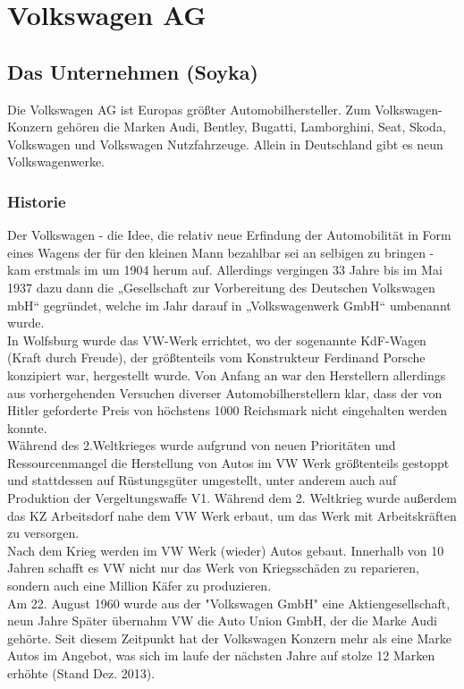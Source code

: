 \documentclass[12pt]{article}
\begin{document}
\section{Volkswagen AG}
\subsection{Das Unternehmen (Soyka) }
Die Volkswagen AG ist Europas größter Automobilhersteller. Zum Volkswagen-Konzern gehören die Marken Audi, Bentley, Bugatti, Lamborghini, Seat, Skoda, Volkswagen und Volkswagen Nutzfahrzeuge. Allein in Deutschland gibt es neun Volkswagenwerke.
\subsubsection{Historie}
Der Volkswagen - die Idee, die relativ neue Erfindung der Automobilität in Form eines Wagens der für den kleinen Mann bezahlbar sei an selbigen zu bringen - kam erstmals im um 1904 herum auf. Allerdings vergingen 33 Jahre bis im Mai 1937 dazu dann die „Gesellschaft zur Vorbereitung des Deutschen Volkswagen mbH“ gegründet, welche im Jahr darauf in „Volkswagenwerk GmbH“ umbenannt wurde.\cite{vwchronik} \\
In Wolfsburg wurde das VW-Werk errichtet, wo der sogenannte KdF-Wagen (Kraft durch Freude), der größtenteils vom Konstrukteur Ferdinand Porsche konzipiert war, hergestellt wurde. Von Anfang an war den Herstellern allerdings aus vorhergehenden Versuchen diverser Automobilherstellern klar, dass der von Hitler geforderte Preis von höchstens 1000 Reichsmark nicht eingehalten werden konnte. \cite{geschdautos}\\
Während des 2.Weltkrieges wurde aufgrund von neuen Prioritäten und Ressourcenmangel die Herstellung von Autos im VW Werk größtenteils gestoppt und stattdessen auf Rüstungsgüter umgestellt, unter anderem auch auf Produktion der Vergeltungswaffe V1.\cite{autowp} Während dem 2. Weltkrieg wurde außerdem das KZ Arbeitsdorf nahe dem VW Werk erbaut, um das Werk mit Arbeitskräften zu versorgen.\cite{terror}  
\\
Nach dem Krieg werden im VW Werk (wieder) Autos gebaut. Innerhalb von 10 Jahren schafft es VW nicht nur das Werk von Kriegsschäden zu reparieren, sondern auch eine Million Käfer zu produzieren. \cite{ahwest}\\
Am 22. August 1960 wurde aus der "Volkswagen GmbH" eine Aktiengesellschaft, neun Jahre Später übernahm VW die Auto Union GmbH, der die Marke Audi gehörte. Seit diesem Zeitpunkt hat der Volkswagen Konzern mehr als eine Marke Autos im Angebot, was sich im laufe der nächsten Jahre auf stolze 12 Marken erhöhte (Stand Dez. 2013). \cite{vwag}
\end{document}
